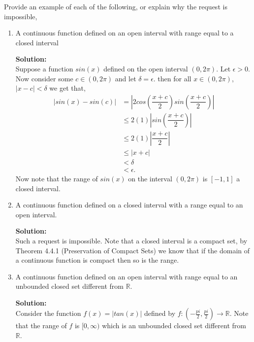 \documentclass[12pt]{article}
\makeatletter
\theoremstyle{homework}
\newenvironment{exercise}[1]
{\def\@currentlabel{#1}\exercisecore}
{\endexercisecore}
\newcommand{\localhead}[1]{\par\smallskip\noindent\textbf{#1}\nobreak\\}%
\newcommand\solution{\localhead{Solution:}}
\newcommand{\Reals}{\ensuremath{\mathbb R}}
\makeatother
\begin{document}
\begin{exercise}{Abbott 4.5.2} Provide an example of each of the following, or explain why the request is impossible,\\

  \begin{enumerate}
    \item A continuous function defined on an open interval with range equal to a closed interval\\
    \solution Suppose a function $sin(x)$ defined on the open interval $(0,2\pi)$. Let 
    $\epsilon>0$. Now consider some $c \in (0,2\pi)$ and let $\delta = \epsilon$. then for all $x \in (0,2\pi)$, $|x - c|< \delta$ we get that,
    \begin{align*}
      |sin(x) - sin(c)| &=  |2cos(\dfrac{x + c}{2})sin(\dfrac{x + c}{2})|\\
      &\le 2(1)|sin(\dfrac{x + c}{2})|\\
      &\le 2(1)|\dfrac{x + c}{2}|\\
      &\le |x + c|\\
      &< \delta\\
      &< \epsilon.
    \end{align*}
      Now note that the range of $sin(x)$ on the interval $(0,2\pi)$ is $[-1,1]$ a closed interval.
      \vspace{.25in}



    \item A continuous function defined on a closed interval with a range equal to an open interval.\\
    \solution Such a request is impossible. Note that a closed interval is a compact set, by Theorem 4.4.1 (Preservation of Compact Sets) 
    we know that if the domain of a continuous function is compact then so is the range.
    \vspace{.25in}
    


    \item A continuous function defined on an open interval with range equal to an unbounded closed set different 
    from $\Reals$.\\
     \solution Consider the function $f(x) = |tan(x)|$ defined by $f:(-\frac{pi}{2},\frac{pi}{2}) \to \Reals$. Note that the 
     range of $f$ is $[0, \infty)$ which is an unbounded closed set different from $\Reals$.
     \vspace{.25in}



\end{enumerate}
\end{exercise}
\end{document}
